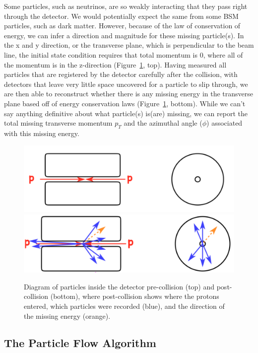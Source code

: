 Some particles, such as neutrinos, are so weakly interacting that they pass right through the detector. We would potentially expect the same from some BSM particles, such as dark matter. However, because of the law of conservation of energy, we can infer a direction and magnitude for these missing particle(s). In the x and y direction, or the transverse plane, which is perpendicular to the beam line, the initial state condition requires that total momentum is 0, where all of the momentum is in the z-direction (Figure~\ref{prepostCollision}, top). Having measured all particles that are registered by the detector carefully after the collision, with detectors that leave very little space uncovered for a particle to slip through, we are then able to reconstruct whether there is any missing energy in the transverse plane based off of energy conservation laws (Figure~\ref{prepostCollision}, bottom). While we can't say anything definitive about what particle(s) is(are) missing, we can report the total missing transverse momentum $p_{T}$ and the azimuthal angle ($\phi$) associated with this missing energy.
\begin{figure}[h!]
\centering
\includegraphics[width=\textwidth]{F3/preCollision.png}\\
\includegraphics[width=\textwidth]{F3/postCollision.png}
\caption{Diagram of particles inside the detector pre-collision (top) and post-collision (bottom), where post-collision shows where the protons entered, which particles were recorded (blue), and the direction of the missing energy (orange).}
\label{prepostCollision}
\end{figure}

\vspace{5mm}
\subsection{The Particle Flow Algorithm}

